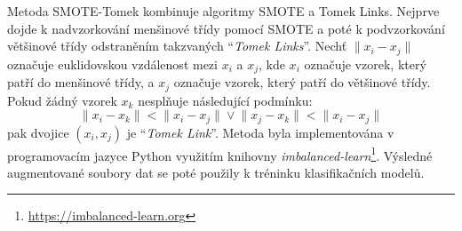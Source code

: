 Metoda SMOTE-Tomek kombinuje algoritmy SMOTE a Tomek Links. Nejprve dojde k
nadvzorkování menšinové třídy pomocí SMOTE a poté k podvzorkování většinové
třídy odstraněním takzvaných \enquote{\textit{Tomek Links}}. Nechť $\lVert x_i -
x_j \rVert$ označuje euklidovskou vzdálenost mezi $x_i$ a $x_j$, kde $x_i$
označuje vzorek, který patří do menšinové třídy, a $x_j$ označuje vzorek, který
patří do většinové třídy. Pokud žádný vzorek $x_k$ nesplňuje následující
podmínku:
\begin{equation}
    \lVert x_i - x_k \rVert < \lVert x_i - x_j \rVert \lor \lVert x_j - x_k \rVert < \lVert x_i - x_j \rVert
\end{equation}
pak dvojice $(x_i, x_j)$ je \enquote{\textit{Tomek Link}}. Metoda byla
implementována v programovacím jazyce Python využitím knihovny
\textit{imbalanced-learn}\footnote{\url{https://imbalanced-learn.org}}. Výsledné
augmentované soubory dat se poté použily k tréninku klasifikačních modelů.